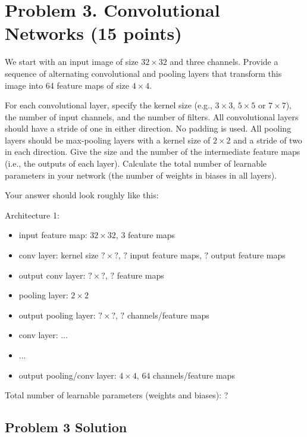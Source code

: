 \documentclass[a4paper,12pt]{article}
\begin{document}
\newpage
\section*{Problem 3. Convolutional Networks (15 points)}
We start with an input image of size $32 \times 32$ and three channels. 
Provide a sequence of alternating convolutional and pooling layers that transform this image into 64 feature maps of size $4 \times 4$. 

For each convolutional layer, specify the kernel size (e.g., $3 \times 3$, $5 \times 5$ or $7 \times 7$), the number of input channels, and the number of filters. 
All convolutional layers should have a stride of one in either direction. No padding is used. 
All pooling layers should be max-pooling layers with a kernel size of $2 \times 2$ and a stride of two in each direction. 
Give the size and the number of the intermediate feature maps (i.e., the outputs of each layer).
Calculate the total number of learnable parameters in your network (the number of weights in biases in all layers).


Your answer should look roughly like this: 

\noindent Architecture 1:
\begin{itemize}
    \item input feature map: $32 \times 32$, $3$ feature maps
    \item conv layer: kernel size $? \times ?$, $?$ input feature maps, $?$ output feature maps
    \item output conv layer: $? \times ?$, $?$ feature maps
    \item pooling layer: $2 \times 2$
    \item output pooling layer: $? \times ?$, $?$ channels/feature maps
    \item conv layer: ...
    \item ...
    \item output pooling/conv layer: $4 \times 4$, $64$ channels/feature maps
\end{itemize}
Total number of learnable parameters (weights and biases): ? 

\subsection*{Problem 3 Solution}
\end{document}
